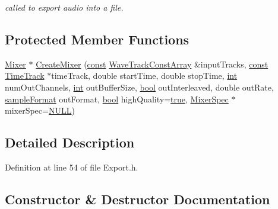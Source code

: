 \begin{DoxyCompactItemize}
\begin{DoxyCompactList}\small\item\em called to export audio into a file. \end{DoxyCompactList}\end{DoxyCompactItemize}
\subsection*{Protected Member Functions}
\begin{DoxyCompactItemize}
\item 
\hyperlink{class_mixer}{Mixer} $\ast$ \hyperlink{class_export_plugin_a66bd6546029d317458538755d814e6a5}{Create\+Mixer} (\hyperlink{getopt1_8c_a2c212835823e3c54a8ab6d95c652660e}{const} \hyperlink{class_wave_track_const_array}{Wave\+Track\+Const\+Array} \&input\+Tracks, \hyperlink{getopt1_8c_a2c212835823e3c54a8ab6d95c652660e}{const} \hyperlink{class_time_track}{Time\+Track} $\ast$time\+Track, double start\+Time, double stop\+Time, \hyperlink{xmltok_8h_a5a0d4a5641ce434f1d23533f2b2e6653}{int} num\+Out\+Channels, \hyperlink{xmltok_8h_a5a0d4a5641ce434f1d23533f2b2e6653}{int} out\+Buffer\+Size, \hyperlink{mac_2config_2i386_2lib-src_2libsoxr_2soxr-config_8h_abb452686968e48b67397da5f97445f5b}{bool} out\+Interleaved, double out\+Rate, \hyperlink{include_2audacity_2_types_8h_a9938d2e2f6adef23e745cd80ef379792}{sample\+Format} out\+Format, \hyperlink{mac_2config_2i386_2lib-src_2libsoxr_2soxr-config_8h_abb452686968e48b67397da5f97445f5b}{bool} high\+Quality=\hyperlink{mac_2config_2i386_2lib-src_2libsoxr_2soxr-config_8h_a41f9c5fb8b08eb5dc3edce4dcb37fee7}{true}, \hyperlink{class_mixer_spec}{Mixer\+Spec} $\ast$mixer\+Spec=\hyperlink{px__mixer_8h_a070d2ce7b6bb7e5c05602aa8c308d0c4}{N\+U\+LL})
\end{DoxyCompactItemize}


\subsection{Detailed Description}


Definition at line 54 of file Export.\+h.



\subsection{Constructor \& Destructor Documentation}
